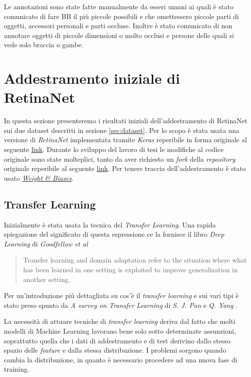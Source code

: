 Le annotazioni sono state fatte manualmente da esseri umani ai quali è stato comunicato di fare \ac{BB} il più piccole possibili e che omettessero piccole parti di oggetti, accessori personali e parti occluse. Inoltre è stato comunicato di non annotare oggetti di piccole dimensioni o molto occlusi e persone delle quali si vede solo braccia o gambe.

\section{Addestramento iniziale di RetinaNet}
\label{sec:addestramento_iniziale_di_retinanet}
In questa sezione presenteremo i risultati iniziali dell'addestramento di RetinaNet sui due dataset descritti in sezione \ref{sec:dataset}. Per lo scopo è stata usata una versione di \textit{RetinaNet} implementata tramite \textit{Keras} reperibile in forma originale al seguente \href{https://github.com/fizyr/keras-retinanet}{link}. Durante lo sviluppo del lavoro di tesi le modifiche al codice originale sono state molteplici, tanto da aver richiesto un \textit{fork} della \textit{repository} originale reperibile al seguente \href{https://github.com/iskorini/keras-retinanet}{link}. Per tenere traccia dell'addestramento è stato usato \href{https://www.wandb.com}{\textit{Weight \& Biases}}.
\subsection{Transfer Learning}
\label{subsec:transfer_learning}
Inizialmente è stata usata la tecnica del \textit{Transfer Learning}. Una rapida spiegazione del significato di questa espressione ce la fornisce il libro \textit{Deep Learning} di \textit{Goodfellow et al} \cite{Goodfellow-et-al-2016}
\begin{quote}
    Transfer learning and domain adaptation refer to the situation where what has been learned in one setting is exploited to improve generalization in another setting.
\end{quote}
Per un'introduzione più dettagliata su cos'è il \textit{transfer learning} e sui vari tipi è stato preso spunto da \textit{A survey on Transfer Learning} di \textit{S. J. Pan} e \textit{Q. Yang} \cite{5288526}. 

La necessità di attuare tecniche di \textit{transfer learning} deriva dal fatto che molti modelli di Machine Learning lavorano bene solo sotto determinate assunzioni, soprattutto quella che i dati di addestramento e di test derivino dallo stesso spazio delle \textit{feature} e dalla stessa distribuzione. I problemi sorgono quando cambia la distribuzione, in quanto è necessario procedere ad una nuova fase di training. 

